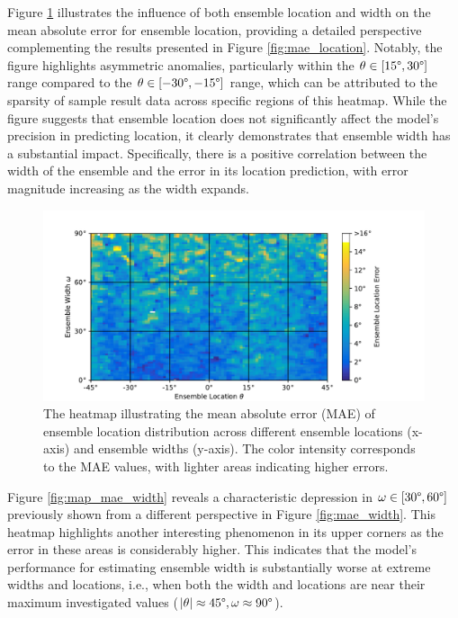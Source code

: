 \documentclass[11pt]{article}
\begin{document}
Figure \ref{fig:map_mae_location} illustrates the influence of both ensemble location and width on the mean absolute error for ensemble location, providing a detailed perspective complementing the results presented in Figure \ref{fig:mae_location}. Notably, the figure highlights asymmetric anomalies, particularly within the $\theta \in [15\degree, 30\degree]$ range compared to the $\theta \in [-30\degree, -15\degree]$ range, which can be attributed to the sparsity of sample result data across specific regions of this heatmap. While the figure suggests that ensemble location does not significantly affect the model's precision in predicting location, it clearly demonstrates that ensemble width has a substantial impact. Specifically, there is a positive correlation between the width of the ensemble and the error in its location prediction, with error magnitude increasing as the width expands.

\begin{figure}[ht!]
  \centering
  \includegraphics[width=\linewidth]{../figures/map_mae_location.pdf}
  \caption{\label{fig:map_mae_location}The heatmap illustrating the mean absolute error (MAE) of ensemble location distribution across different ensemble locations (x-axis) and ensemble widths (y-axis). The color intensity corresponds to the MAE values, with lighter areas indicating higher errors.}
\end{figure}

Figure \ref{fig:map_mae_width} reveals a characteristic depression in $\omega \in [30\degree, 60\degree]$ previously shown from a different perspective in Figure \ref{fig:mae_width}. This heatmap highlights another interesting phenomenon in its upper corners as the error in these areas is considerably higher. This indicates that the model's performance for estimating ensemble width is substantially worse at extreme widths and locations, i.e., when both the width and locations are near their maximum investigated values ($|\theta| \approx 45\degree, \omega \approx 90\degree$).
\end{document}

